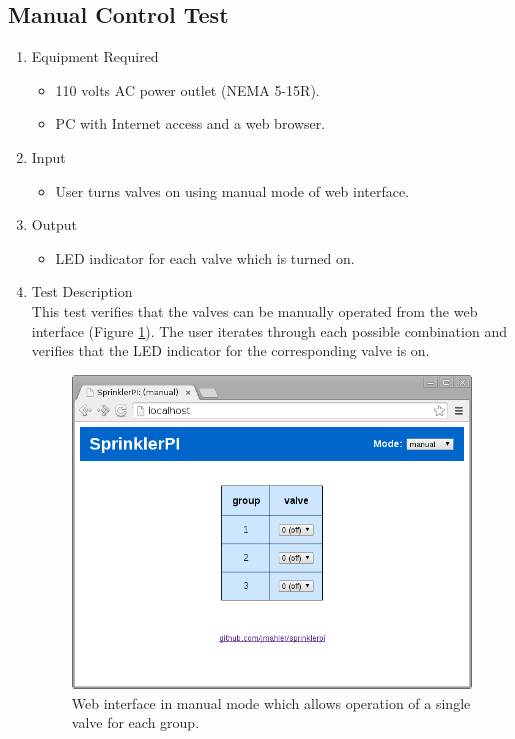 \documentclass{article}
\begin{document}
\clearpage
\subsection{Manual Control Test}
\label{sec:manual-control-test}

\begin{enumerate}
\item Equipment Required
	\begin{itemize}
	\item 110 volts AC power outlet (NEMA 5-15R).
	\item PC with Internet access and a web browser.
	\end{itemize}
\item Input
	\begin{itemize}
	\item User turns valves on using manual mode of web interface.
	\end{itemize}
\item Output
	\begin{itemize}
	\item LED indicator for each valve which is turned on.
	\end{itemize}
\item Test Description \\

This test verifies that the valves can be manually operated from
the web interface (Figure \ref{fig:www-manual_mode}).
The user iterates through each possible combination and verifies
that the LED indicator for the corresponding valve is on.

\begin{figure}[hbp!]
\begin{center}
\includegraphics[scale=0.5]{img/www-manual_mode}
\end{center}
\caption{Web interface in manual mode which allows operation of
a single valve for each group.}
\label{fig:www-manual_mode}
\end{figure}


\end{enumerate}
\end{document}
